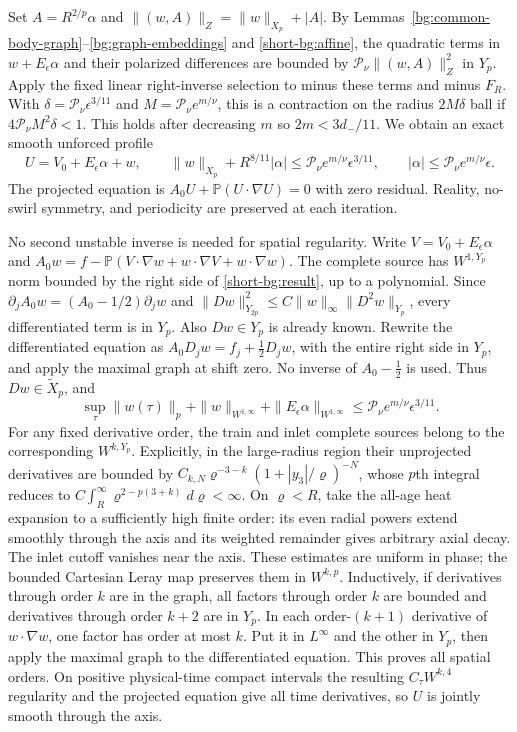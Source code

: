 Set $A=R^{2/p}\alpha$ and $\|(w,A)\|_Z=\|w\|_{X_p}+|A|$.
By Lemmas~\ref{bg:common-body-graph}--\ref{bg:graph-embeddings} and
\eqref{short-bg:affine}, the quadratic
terms in $w+E_\epsilon\alpha$ and their polarized differences are
bounded by $\mathcal P_\nu\|(w,A)\|_Z^2$ in $Y_p$. Apply the fixed
linear right-inverse selection to minus these terms and minus $F_R$.
With $\delta=\mathcal P_\nu\epsilon^{3/11}$ and
$M=\mathcal P_\nu e^{m/\nu}$, this is a contraction on the radius
$2M\delta$ ball if $4\mathcal P_\nu M^2\delta<1$. This holds after
decreasing $m$ so $2m<3d_-/11$. We obtain an exact smooth unforced
profile
\begin{equation}
 U=V_0+E_\epsilon\alpha+w,\qquad
 \|w\|_{X_p}+R^{8/11}|\alpha|
       \le\mathcal P_\nu e^{m/\nu}\epsilon^{3/11},\qquad
 |\alpha|\le\mathcal P_\nu e^{m/\nu}\epsilon.
 \label{short-bg:result}
\end{equation}
The projected equation is
$A_0U+\mathbb P(U\cdot\nabla U)=0$ with zero residual. Reality,
no-swirl symmetry, and periodicity are preserved at each iteration.

No second unstable inverse is needed for spatial regularity. Write
$V=V_0+E_\epsilon\alpha$ and
$A_0w=f-\mathbb P(V\cdot\nabla w+w\cdot\nabla V+w\cdot\nabla w)$.
The complete source has $W^{1,Y_p}$ norm bounded by the right side
of \eqref{short-bg:result}, up to a polynomial. Since
$\partial_jA_0w=(A_0-1/2)\partial_jw$ and
$\|Dw\|_{Y_{2p}}^2\le C\|w\|_\infty\|D^2w\|_{Y_p}$,
every differentiated term is in $Y_p$. Also $Dw\in Y_p$ is already
known. Rewrite the differentiated equation as
$A_0D_jw=f_j+\tfrac12D_jw$, with the entire right side in $Y_p$,
and apply the maximal graph at shift zero. No inverse of
$A_0-\tfrac12$ is used. Thus $Dw\in\widetilde X_p$, and
\begin{equation}
 \sup_\tau\|w(\tau)\|_p+
 \|w\|_{W^{1,\infty}}+\|E_\epsilon\alpha\|_{W^{1,\infty}}
 \le\mathcal P_\nu e^{m/\nu}\epsilon^{3/11}.
 \label{short-bg:strong}
\end{equation}
For any fixed derivative order, the train and inlet complete sources
belong to the corresponding $W^{k,Y_p}$. Explicitly, in the
large-radius region their unprojected derivatives are bounded by
$C_{k,N}\varrho^{-3-k}(1+|y_3|/\varrho)^{-N}$, whose $p$th integral
reduces to $C\int_R^\infty\varrho^{2-p(3+k)}d\varrho<\infty$.
On $\varrho<R$, take the all-age heat expansion to a sufficiently
high finite order: its even radial powers extend smoothly through the
axis and its weighted remainder gives arbitrary axial decay. The
inlet cutoff vanishes near the axis. These estimates are uniform in
phase; the bounded Cartesian Leray map preserves them in $W^{k,p}$.
Inductively, if derivatives
through order $k$ are in the graph, all factors through order $k$ are
bounded and derivatives through order $k+2$ are in $Y_p$. In each
order-$(k+1)$ derivative of $w\cdot\nabla w$, one factor has order at
most $k$. Put it in $L^\infty$ and the other in $Y_p$, then apply the
maximal graph to the differentiated equation. This proves all spatial
orders. On positive physical-time compact intervals the resulting
$C_\tau W^{k,4}$ regularity and the projected equation give all time
derivatives, so $U$ is jointly smooth through the axis.

